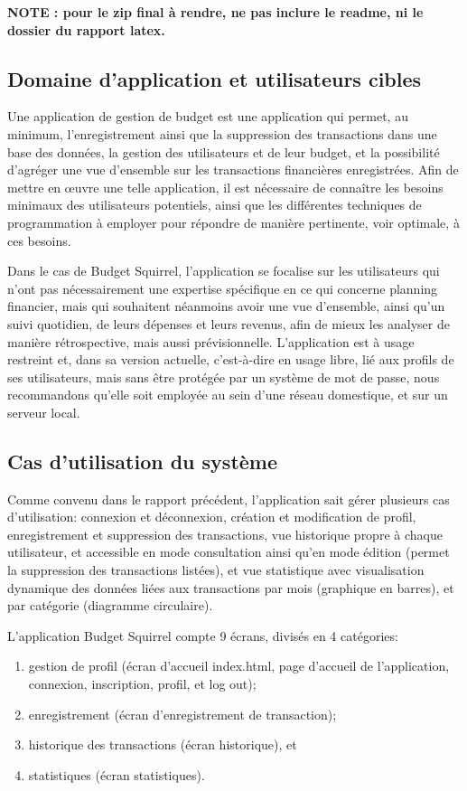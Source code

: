 \documentclass[a4paper,12pt]{article}
\begin{document}
\textbf{NOTE : pour le zip final à rendre, ne pas inclure le readme, ni le dossier du rapport latex.}

\subsection{Domaine d'application et utilisateurs cibles}

Une application de gestion de budget est une application qui permet, au minimum, l'enregistrement ainsi que la suppression des transactions dans une base des données, la gestion des utilisateurs et de leur budget, et la possibilité d'agréger une vue d'ensemble sur les transactions financières enregistrées.
Afin de mettre en œuvre une telle application, il est nécessaire de connaître les besoins minimaux des utilisateurs potentiels, ainsi que les différentes techniques de programmation à employer pour répondre de manière pertinente, voir optimale, à ces besoins.

Dans le cas de Budget Squirrel, l'application se focalise sur les utilisateurs qui n’ont pas nécessairement une expertise spécifique en ce qui concerne planning financier, mais qui souhaitent néanmoins avoir une vue d’ensemble, ainsi qu’un suivi quotidien, de leurs dépenses et leurs revenus, afin de mieux les analyser de manière rétrospective, mais aussi prévisionnelle.
L'application est à usage restreint et, dans sa version actuelle, c'est-à-dire en usage libre, lié aux profils de ses utilisateurs, mais sans être protégée par un système de mot de passe, nous recommandons qu'elle soit employée au sein d'une réseau domestique, et sur un serveur local.

\subsection{Cas d'utilisation du système}

Comme convenu dans le rapport précédent, l'application sait gérer plusieurs cas d'utilisation: connexion et déconnexion, création et modification de profil, enregistrement et suppression des transactions, vue historique propre à chaque utilisateur, et accessible en mode consultation ainsi qu'en mode édition (permet la suppression des transactions listées), et vue statistique avec visualisation dynamique des données liées aux transactions par mois (graphique en barres), et par catégorie (diagramme circulaire).

L'application Budget Squirrel compte 9 écrans, divisés en 4 catégories:
\begin{enumerate}
\item gestion de profil (écran d’accueil index.html, page d'accueil de l'application, connexion, inscription, profil, et log out);
\item enregistrement (écran d'enregistrement de transaction);
\item historique des transactions (écran historique), et 
\item statistiques (écran statistiques).
\end{enumerate}
\end{document}
